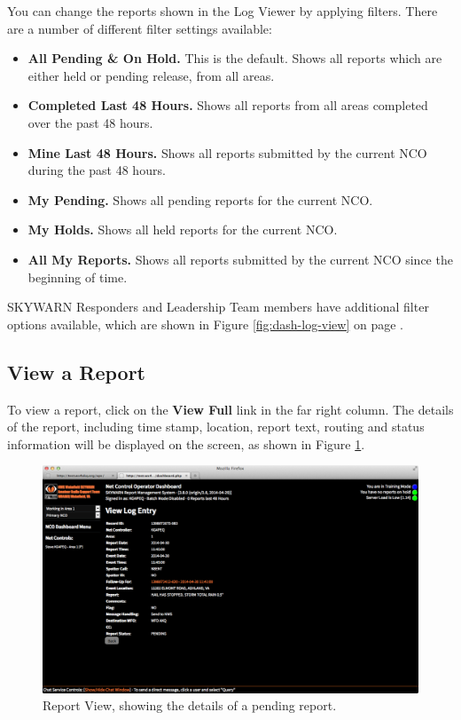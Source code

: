 \documentclass[pdflatex,letterpaper,twoside,12pt]{book}
\begin{document}
You can change the reports shown in the Log Viewer by applying filters.  There are a number of different filter settings available:

\begin{itemize}
\item \textbf{All Pending \& On Hold.}  This is the default.  Shows all reports which are either held or pending release, from all areas.
\item \textbf{Completed Last 48 Hours.}  Shows all reports from all areas completed over the past 48 hours.
\item \textbf{Mine Last 48 Hours.}  Shows all reports submitted by the current NCO during the past 48 hours.
\item \textbf{My Pending.}  Shows all pending reports for the current NCO.
\item \textbf{My Holds.}  Shows all held reports for the current NCO.
\item \textbf{All My Reports.}  Shows all reports submitted by the current NCO since the beginning of time.
\end{itemize}

SKYWARN Responders and Leadership Team members have additional filter options available, which are shown in Figure \ref{fig:dash-log-view} on page \pageref{fig:dash-log-view}.

\subsection{View a Report}

To view a report, click on the \textbf{View Full} link in the far right column.  The details of the report, including time stamp, location, report text, routing and status information will be displayed on the screen, as shown in Figure \ref{fig:dash-report-view}.

\begin{figure}[h]
  \centering
  \includegraphics[width=\textwidth,keepaspectratio=true]{img/dash-report-view}
  \caption{Report View, showing the details of a pending report.\label{fig:dash-report-view}}
\end{figure}
\end{document}
